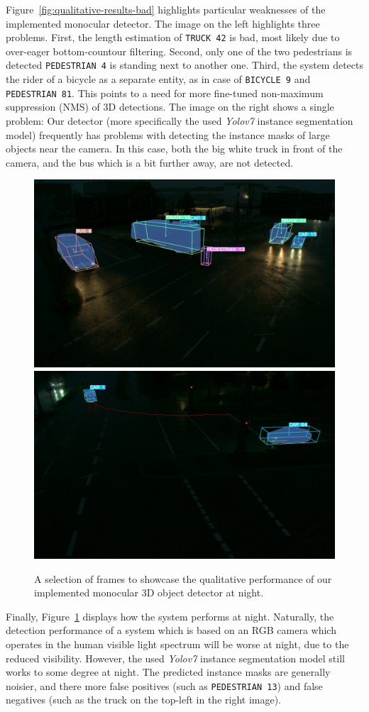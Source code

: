 Figure~\ref{fig:qualitative-results-bad} highlights particular weaknesses of the implemented monocular detector.
The image on the left highlights three problems.
First, the length estimation of \texttt{TRUCK 42} is bad, most likely due to over-eager bottom-countour filtering.
Second, only one of the two pedestrians is detected \textemdash \texttt{PEDESTRIAN 4} is standing next to another one.
Third, the system detects the rider of a bicycle as a separate entity, as in case of \texttt{BICYCLE 9} and \texttt{PEDESTRIAN 81}.
This points to a need for more fine-tuned non-maximum suppression (NMS) of 3D detections.
The image on the right shows a single problem: Our detector (more specifically the used \textit{Yolov7} instance segmentation model) frequently has problems with detecting the instance masks of large objects near the camera.
In this case, both the big white truck in front of the camera, and the bus which is a bit further away, are not detected.

\begin{figure}[htb]
    \includegraphics[width=0.499\linewidth]{
        figures/selection/1653330059-588901912-s110-camera-basler-south2-8mm}
    \includegraphics[width=0.499\linewidth]{
        figures/selection/1653330064-207615030-s110-camera-basler-south1-8mm}
    \caption{A selection of frames to showcase the qualitative performance of our implemented monocular 3D object detector at night.}
    \label{fig:qualitative-results-night}
\end{figure}

Finally, Figure~\ref{fig:qualitative-results-night} displays how the system performs at night.
Naturally, the detection performance of a system which is based on an RGB camera which operates in the human visible light spectrum will be worse at night, due to the reduced visibility.
However, the used \textit{Yolov7} instance segmentation model still works to some degree at night.
The predicted instance masks are generally noisier, and there more false positives (such as \texttt{PEDESTRIAN 13}) and false negatives (such as the truck on the top-left in the right image).

